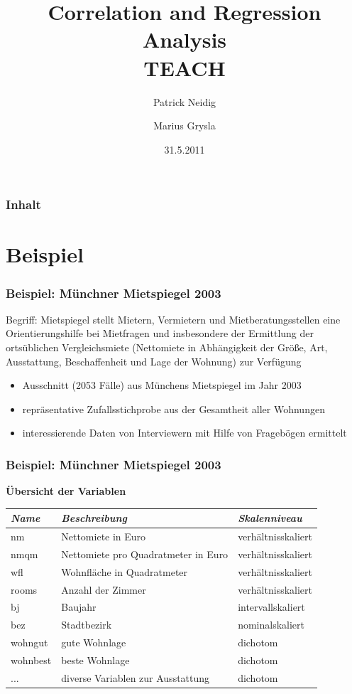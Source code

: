 \documentclass{beamer}
\begin{document}
\title{Correlation and Regression Analysis\\
TEACH}
\author{Patrick Neidig \and Marius Grysla}
\date{31.5.2011}
\frame{\titlepage}

\begin{frame}
 \frametitle{Inhalt}
 \tableofcontents
\end{frame}

\section{Beispiel}

\begin{frame}
	\frametitle{Beispiel: Münchner Mietspiegel 2003}
	
	\begin{block}{Begriff: Mietspiegel}
		stellt Mietern, Vermietern und Mietberatungsstellen eine Orientierungshilfe bei Mietfragen und insbesondere der Ermittlung der 	ortsüblichen  Vergleichsmiete (Nettomiete in Abhängigkeit der Größe, Art, Ausstattung, Beschaffenheit und Lage der Wohnung) zur Verfügung
	\end{block}
	
	\begin{itemize}
		\item Ausschnitt (2053 Fälle) aus Münchens Mietspiegel im Jahr 2003
		\item repräsentative Zufallsstichprobe aus der Gesamtheit aller Wohnungen
		\item interessierende Daten von Interviewern mit Hilfe von Fragebögen ermittelt
	\end{itemize}
\end{frame}

\begin{frame}
	\frametitle{Beispiel: Münchner Mietspiegel 2003}
	
	\par \textbf{Übersicht der Variablen}\\[3mm]
	
	\begin{tabular}[ht]{|l|l|l|}
  	\hline
  	\textit{Name} & \textit{Beschreibung} & \textit{Skalenniveau}\\
  	\hline \hline
  	nm & Nettomiete in Euro & verhältnisskaliert\\ \hline
  	nmqm & Nettomiete pro Quadratmeter in Euro & verhältnisskaliert\\ \hline
  	wfl & Wohnfläche in Quadratmeter & verhältnisskaliert\\ \hline
  	rooms & Anzahl der Zimmer & verhältnisskaliert\\ \hline
  	bj & Baujahr & intervallskaliert\\ \hline
  	bez & Stadtbezirk & nominalskaliert\\ \hline
  	wohngut & gute Wohnlage & dichotom\\ \hline
  	wohnbest & beste Wohnlage & dichotom\\ \hline
  	... & diverse Variablen zur Ausstattung & dichotom\\
  	\hline
	\end{tabular}
\end{frame}
\end{document}
